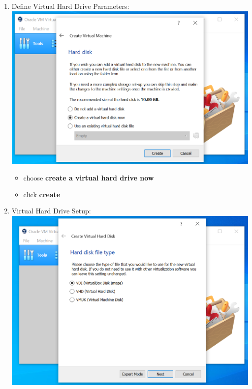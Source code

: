 \documentclass[12pt]{article}
\begin{document}
\begin{description}
\begin{description}
\begin{enumerate}[label=\alph*)]
\newpage
\item Define Virtual Hard Drive Parameters: \vspace{5mm} \\
      		\hspace*{-2.5cm}\includegraphics[scale=.55]{Capture6.png}\\
 \begin{itemize}
                
       
                \item choose {\bf create a virtual hard drive now}
                \item click {\bf create}
                
                
            \end{itemize}
\vspace{10mm}
\item Virtual Hard Drive Setup: \vspace{5mm} \\

        \hspace*{-2.5cm}\includegraphics[scale=.55]{Capture7.png}\\
        \begin{itemize}
                        

\end{itemize}
\end{enumerate}
\end{description}
\end{description}
\end{document}
